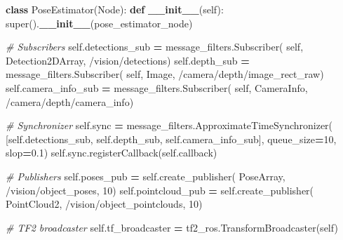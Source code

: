 \documentclass[
]{article}
\newenvironment{Shaded}{\begin{snugshade}}{\end{snugshade}}
\newcommand{\BuiltInTok}[1]{#1}
\newcommand{\CommentTok}[1]{\textcolor[rgb]{0.56,0.35,0.01}{\textit{#1}}}
\newcommand{\DecValTok}[1]{\textcolor[rgb]{0.00,0.00,0.81}{#1}}
\newcommand{\FloatTok}[1]{\textcolor[rgb]{0.00,0.00,0.81}{#1}}
\newcommand{\FunctionTok}[1]{\textcolor[rgb]{0.13,0.29,0.53}{\textbf{#1}}}
\newcommand{\KeywordTok}[1]{\textcolor[rgb]{0.13,0.29,0.53}{\textbf{#1}}}
\newcommand{\NormalTok}[1]{#1}
\newcommand{\OperatorTok}[1]{\textcolor[rgb]{0.81,0.36,0.00}{\textbf{#1}}}
\newcommand{\StringTok}[1]{\textcolor[rgb]{0.31,0.60,0.02}{#1}}
\newcommand{\VariableTok}[1]{\textcolor[rgb]{0.00,0.00,0.00}{#1}}
\begin{document}
\begin{Shaded}
\begin{Highlighting}[]
\KeywordTok{class}\NormalTok{ PoseEstimator(Node):}
    \KeywordTok{def} \FunctionTok{\_\_init\_\_}\NormalTok{(}\VariableTok{self}\NormalTok{):}
        \BuiltInTok{super}\NormalTok{().}\FunctionTok{\_\_init\_\_}\NormalTok{(}\StringTok{\textquotesingle{}pose\_estimator\_node\textquotesingle{}}\NormalTok{)}

        \CommentTok{\# Subscribers}
        \VariableTok{self}\NormalTok{.detections\_sub }\OperatorTok{=}\NormalTok{ message\_filters.Subscriber(}
            \VariableTok{self}\NormalTok{, Detection2DArray, }\StringTok{\textquotesingle{}/vision/detections\textquotesingle{}}\NormalTok{)}
        \VariableTok{self}\NormalTok{.depth\_sub }\OperatorTok{=}\NormalTok{ message\_filters.Subscriber(}
            \VariableTok{self}\NormalTok{, Image, }\StringTok{\textquotesingle{}/camera/depth/image\_rect\_raw\textquotesingle{}}\NormalTok{)}
        \VariableTok{self}\NormalTok{.camera\_info\_sub }\OperatorTok{=}\NormalTok{ message\_filters.Subscriber(}
            \VariableTok{self}\NormalTok{, CameraInfo, }\StringTok{\textquotesingle{}/camera/depth/camera\_info\textquotesingle{}}\NormalTok{)}

        \CommentTok{\# Synchronizer}
        \VariableTok{self}\NormalTok{.sync }\OperatorTok{=}\NormalTok{ message\_filters.ApproximateTimeSynchronizer(}
\NormalTok{            [}\VariableTok{self}\NormalTok{.detections\_sub, }\VariableTok{self}\NormalTok{.depth\_sub, }\VariableTok{self}\NormalTok{.camera\_info\_sub],}
\NormalTok{            queue\_size}\OperatorTok{=}\DecValTok{10}\NormalTok{, slop}\OperatorTok{=}\FloatTok{0.1}\NormalTok{)}
        \VariableTok{self}\NormalTok{.sync.registerCallback(}\VariableTok{self}\NormalTok{.callback)}

        \CommentTok{\# Publishers}
        \VariableTok{self}\NormalTok{.poses\_pub }\OperatorTok{=} \VariableTok{self}\NormalTok{.create\_publisher(}
\NormalTok{            PoseArray, }\StringTok{\textquotesingle{}/vision/object\_poses\textquotesingle{}}\NormalTok{, }\DecValTok{10}\NormalTok{)}
        \VariableTok{self}\NormalTok{.pointcloud\_pub }\OperatorTok{=} \VariableTok{self}\NormalTok{.create\_publisher(}
\NormalTok{            PointCloud2, }\StringTok{\textquotesingle{}/vision/object\_pointclouds\textquotesingle{}}\NormalTok{, }\DecValTok{10}\NormalTok{)}

        \CommentTok{\# TF2 broadcaster}
        \VariableTok{self}\NormalTok{.tf\_broadcaster }\OperatorTok{=}\NormalTok{ tf2\_ros.TransformBroadcaster(}\VariableTok{self}\NormalTok{)}


\end{Highlighting}
\end{Shaded}
\end{document}
